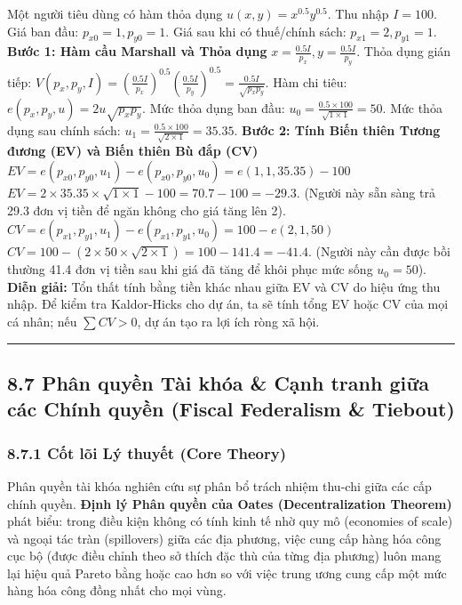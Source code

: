 \documentclass[
]{article}
\begin{document}
Một người tiêu dùng có hàm thỏa dụng \(u(x, y) = x^{0.5} y^{0.5}\). Thu
nhập \(I = 100\). Giá ban đầu: \(p_{x0} = 1, p_{y0} = 1\). Giá sau khi
có thuế/chính sách: \(p_{x1} = 2, p_{y1} = 1\). \textbf{Bước 1: Hàm cầu
Marshall và Thỏa dụng} \(x = \frac{0.5 I}{p_x}, y = \frac{0.5 I}{p_y}\).
Thỏa dụng gián tiếp:
\(V(p_x, p_y, I) = \left(\frac{0.5 I}{p_x}\right)^{0.5} \left(\frac{0.5 I}{p_y}\right)^{0.5} = \frac{0.5 I}{\sqrt{p_x p_y}}\).
Hàm chi tiêu: \(e(p_x, p_y, u) = 2 u \sqrt{p_x p_y}\). Mức thỏa dụng ban
đầu: \(u_0 = \frac{0.5 \times 100}{\sqrt{1 \times 1}} = 50\). Mức thỏa
dụng sau chính sách:
\(u_1 = \frac{0.5 \times 100}{\sqrt{2 \times 1}} = 35.35\). \textbf{Bước
2: Tính Biến thiên Tương đương (EV) và Biến thiên Bù đắp (CV)}
\(EV = e(p_{x0}, p_{y0}, u_1) - e(p_{x0}, p_{y0}, u_0) = e(1, 1, 35.35) - 100\)
\(EV = 2 \times 35.35 \times \sqrt{1 \times 1} - 100 = 70.7 - 100 = -29.3\).
(Người này sẵn sàng trả 29.3 đơn vị tiền để ngăn không cho giá tăng lên
2).
\(CV = e(p_{x1}, p_{y1}, u_1) - e(p_{x1}, p_{y1}, u_0) = 100 - e(2, 1, 50)\)
\(CV = 100 - (2 \times 50 \times \sqrt{2 \times 1}) = 100 - 141.4 = -41.4\).
(Người này cần được bồi thường 41.4 đơn vị tiền sau khi giá đã tăng để
khôi phục mức sống \(u_0=50\)). \textbf{Diễn giải:} Tổn thất tính bằng
tiền khác nhau giữa EV và CV do hiệu ứng thu nhập. Để kiểm tra
Kaldor-Hicks cho dự án, ta sẽ tính tổng EV hoặc CV của mọi cá nhân; nếu
\(\sum CV > 0\), dự án tạo ra lợi ích ròng xã hội.

\begin{center}\rule{0.5\linewidth}{0.5pt}\end{center}

\subsection{8.7 Phân quyền Tài khóa \& Cạnh tranh giữa các Chính quyền
(Fiscal Federalism \&
Tiebout)}\label{phuxe2n-quyux1ec1n-tuxe0i-khuxf3a-cux1ea1nh-tranh-giux1eefa-cuxe1c-chuxednh-quyux1ec1n-fiscal-federalism-tiebout}

\subsubsection{8.7.1 Cốt lõi Lý thuyết (Core
Theory)}\label{cux1ed1t-luxf5i-luxfd-thuyux1ebft-core-theory-31}

Phân quyền tài khóa nghiên cứu sự phân bổ trách nhiệm thu-chi giữa các
cấp chính quyền. \textbf{Định lý Phân quyền của Oates (Decentralization
Theorem)} phát biểu: trong điều kiện không có tính kinh tế nhờ quy mô
(economies of scale) và ngoại tác tràn (spillovers) giữa các địa phương,
việc cung cấp hàng hóa công cục bộ (được điều chỉnh theo sở thích đặc
thù của từng địa phương) luôn mang lại hiệu quả Pareto bằng hoặc cao hơn
so với việc trung ương cung cấp một mức hàng hóa công đồng nhất cho mọi
vùng.
\end{document}
